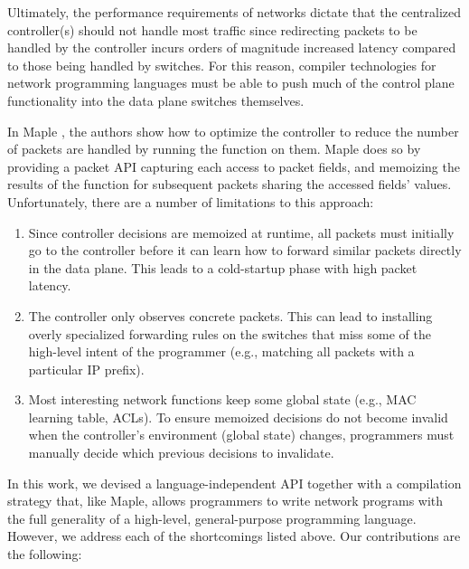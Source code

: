 \documentclass[preprint]{sigplanconf}
\begin{document}
Ultimately, the performance requirements of networks dictate that the centralized controller(s) should not handle most traffic since redirecting packets to be handled by the controller incurs orders of magnitude increased latency compared to those being handled by switches. For this reason, compiler technologies for network programming languages must be able to push much of the control plane functionality into the data plane switches themselves. 

In Maple \cite{Maple}, the authors show how to optimize the controller to reduce the number of packets are handled by running the function on them. Maple does so by providing a packet API capturing each access to packet fields, and memoizing the results of the function for subsequent packets sharing the accessed fields' values. Unfortunately, there are a number of limitations to this approach:


\begin{enumerate}
\item Since controller decisions are memoized at runtime, all packets must initially go to the controller before it can learn how to forward similar packets directly in the data plane. This leads to a cold-startup phase with high packet latency.
\item The controller only observes concrete packets. This can lead to installing overly specialized forwarding rules on the switches that miss some of the high-level intent of the programmer (e.g., matching all packets with a particular IP prefix).
\item Most interesting network functions keep some global state (e.g., MAC learning table, ACLs). To ensure memoized decisions do not become invalid when the controller's environment (global state) changes, programmers must manually decide which previous decisions to invalidate.
\end{enumerate}


In this work, we devised a language-independent API together with a compilation strategy that, like Maple, allows programmers to write network programs with the full generality of a high-level, general-purpose programming language.
However, we address each of the shortcomings  listed above. Our contributions are the following:
\end{document}
